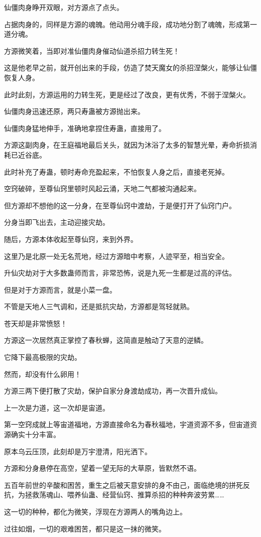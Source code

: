 \begin{this_body}
仙僵肉身睁开双眼，对方源点了点头。

占据肉身的，同样是方源的魂魄。他动用分魂手段，成功地分割了魂魄，形成第一道分魂。

方源微笑着，当即对准仙僵肉身催动仙道杀招力转生死！

这是他老早之前，就开创出来的手段，仿造了焚天魔女的杀招涅槃火，能够让仙僵恢复人身。

此时此刻，方源运用的力转生死，更是经过了改良，更有优秀，不弱于涅槃火。

仙僵肉身迅速还原，两只寿蛊被方源抛出来。

仙僵肉身猛地伸手，准确地拿捏住寿蛊，直接用了。

方源这副肉身，在王庭福地最后关头，就因为沐浴了太多的智慧光晕，寿命折损消耗已近谷底。

此时补充了寿蛊，顿时寿命充盈起来，不怕恢复人身之后，直接老死掉。

空窍破碎，至尊仙窍里顿时风起云涌，天地二气都被沟通起来。

但方源却不想他的这一分身，在至尊仙窍中渡劫，于是便打开了仙窍门户。

分身当即飞出去，主动迎接灾劫。

随后，方源本体收起至尊仙窍，来到外界。

这里乃是北原一处无名荒地，经过方源暗中考察，人迹罕至，相当安全。

升仙灾劫对于大多数蛊师而言，非常恐怖，说是九死一生都是过高的评估。

但是对于方源而言，就是小菜一盘。

不管是天地人三气调和，还是抵抗灾劫，方源都是驾轻就熟。

苍天却是非常愤怒！

方源这一次居然真正掌控了春秋蝉，这简直是触动了天意的逆鳞。

它降下最高极限的灾劫。

然而，却没有什么卵用！

方源三两下便打散了灾劫，保护自家分身渡劫成功，再一次晋升成仙。

上一次是力道，这一次却是宙道。

第一空窍成就上等宙道福地，方源直接命名为春秋福地，宇道资源不多，但宙道资源确实十分丰富。

原本乌云压顶，此刻却是万宇澄清，阳光洒下。

方源和分身悬停在高空，望着一望无际的大草原，皆默然不语。

五百年前世的辛酸和困苦，重生之后被天意安排的身不由己，面临绝境的拼死反抗，为拯救荡魂山、喂养仙蛊、经营仙窍、推算杀招的种种奔波劳累……

这一切的种种，都化为微笑，浮现在方源两人的嘴角边上。

过往如烟，一切的艰难困苦，都只是这一抹的微笑。

\end{this_body}

